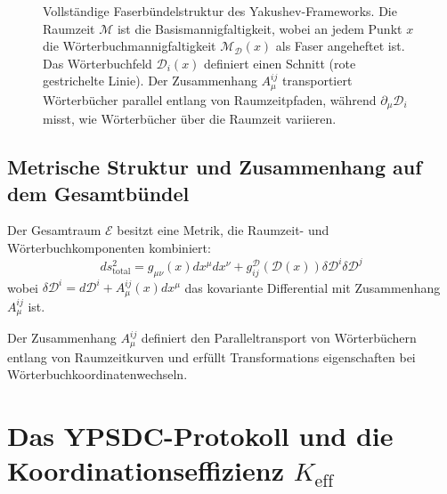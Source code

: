 \documentclass[11pt,a4paper]{article}
\begin{document}
\begin{figure}[htbp]
		\caption{Vollständige Faserbündelstruktur des Yakushev-Frameworks. Die Raumzeit $\mathcal{M}$ ist die Basismannigfaltigkeit, wobei an jedem Punkt $x$ die Wörterbuchmannigfaltigkeit $\mathcal{M}_{\mathcal{D}}(x)$ als Faser angeheftet ist. Das Wörterbuchfeld $\mathcal{D}_i(x)$ definiert einen Schnitt (rote gestrichelte Linie). Der Zusammenhang $A_\mu^{ij}$ transportiert Wörterbücher parallel entlang von Raumzeitpfaden, während $\partial_\mu \mathcal{D}_i$ misst, wie Wörterbücher über die Raumzeit variieren.}
		\label{fig:complete-bundle}
	\end{figure}
	
	\subsection{Metrische Struktur und Zusammenhang auf dem Gesamtbündel}
	Der Gesamtraum $\mathcal{E}$ besitzt eine Metrik, die Raumzeit- und Wörterbuchkomponenten kombiniert:
	\begin{equation}
		ds^2_{\text{total}} = g_{\mu\nu}(x) dx^\mu dx^\nu + g_{ij}^{\mathcal{D}}(\mathcal{D}(x)) \delta\mathcal{D}^i \delta\mathcal{D}^j
	\end{equation}
	wobei $\delta\mathcal{D}^i = d\mathcal{D}^i + A_\mu^{ij}(x) dx^\mu$ das kovariante Differential mit Zusammenhang $A_\mu^{ij}$ ist.
	
	Der Zusammenhang $A_\mu^{ij}$ definiert den Paralleltransport von Wörterbüchern entlang von Raumzeitkurven und erfüllt Transformations eigenschaften bei Wörterbuchkoordinatenwechseln.
	
	\section{Das YPSDC-Protokoll und die Koordinationseffizienz \texorpdfstring{$K_{\mathrm{eff}}$}{K_eff}}
	
\end{document}
